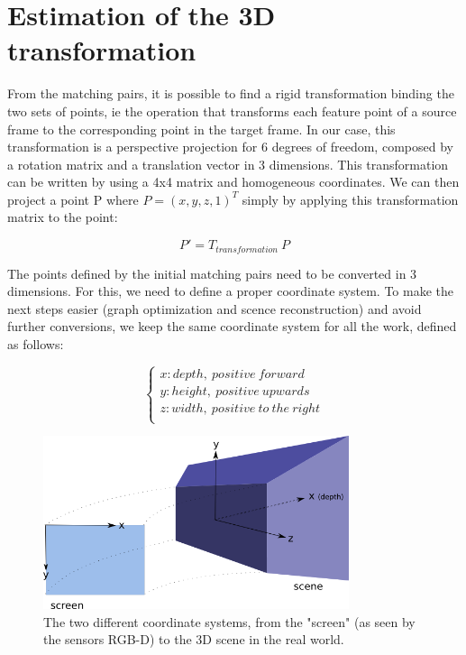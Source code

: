 \section{Estimation of the 3D transformation}

From the matching pairs, it is possible to find a rigid transformation binding the two sets of points, ie the operation that transforms each feature point of a source frame to the corresponding point in the target frame. In our case, this transformation is a perspective projection for 6 degrees of freedom, composed by a rotation matrix and a translation vector in 3 dimensions. This transformation can be written by using a 4x4  matrix and homogeneous coordinates. We can then project a point P where $P = (x,y,z,1)^T$ simply by applying this transformation matrix to the point:

\[
P' = T_{transformation} \: P
\]

The points defined by the initial matching pairs need to be converted in 3 dimensions. For this, we need to define a proper coordinate system. To make the next steps easier (graph optimization and scence reconstruction) and avoid further conversions, we keep the same coordinate system for all the work, defined as follows:

\[
\left\{\begin{array}{l}
x: depth,\:positive\:forward\\
y: height,\:positive\:upwards\\
z: width,\:positive\:to\:the\:right\\
\end{array}
\right.
\]

\begin{figure}[H]
\centering
\includegraphics[width=0.8\textwidth]{figures/coordinates}
\caption{The two different coordinate systems, from the "screen" (as seen by the sensors RGB-D) to the 3D scene in the real world.}
\end{figure}

